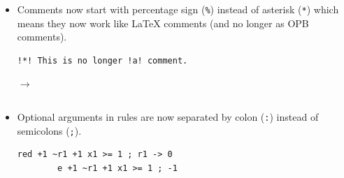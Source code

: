 \documentclass[a4paper]{article}
\newcommand{\veriPB}[0]{\textsc{VeriPB}}
\begin{document}
\begin{itemize}
\begin{minipage}{.47\linewidth}
	      \end{minipage}\hfill%
	      \begin{minipage}[t]{.05\linewidth}
		      \centering \vspace*{-5mm}$\to$
	      \end{minipage}\hfill%
	      \hfill%
	      \begin{minipage}{.47\linewidth}
		      \begin{lstlisting}[language=veripb, gobble=8, rulecolor=\color{veripb-valid-text}, caption={\veriPB{} 3.0 syntax.}]
		pol 1 2 +;
		\end{lstlisting}
	      \end{minipage}
	\item Comments now start with percentage sign (\verb!%!) instead of asterisk (\verb!*!) which means they now work like \LaTeX{} comments (and no longer as OPB comments).
	      \\[1mm]
	      \begin{minipage}{.47\linewidth}
		      \begin{lstlisting}[language=veripb, gobble=8, rulecolor=\color{veripb-invalid-text}, caption={\veriPB{} 2.0 syntax.}]
		!*! This is no longer !a! comment.
		\end{lstlisting}
	      \end{minipage}\hfill%
	      \begin{minipage}[t]{.05\linewidth}
		      \centering \vspace*{-5mm}$\to$
	      \end{minipage}\hfill%
	      \hfill%
	      \begin{minipage}{.47\linewidth}
		      \begin{lstlisting}[language=veripb, gobble=8, rulecolor=\color{veripb-valid-text}, caption={\veriPB{} 3.0 syntax.}]
		% This is now a comment.
		\end{lstlisting}
	      \end{minipage}
	\item Optional arguments in rules are now separated by colon (\verb!:!) instead of semicolons (\verb!;!).
	      \\[1mm]
	      \begin{minipage}{.47\linewidth}
		      \begin{lstlisting}[language=veripb, gobble=8, rulecolor=\color{veripb-invalid-text}, caption={\veriPB{} 2.0 syntax.}]
		red +1 ~r1 +1 x1 >= 1 ; r1 -> 0
		e +1 ~r1 +1 x1 >= 1 ; -1
		\end{lstlisting}
	      \end{minipage}\hfill%

\end{itemize}
\end{document}
